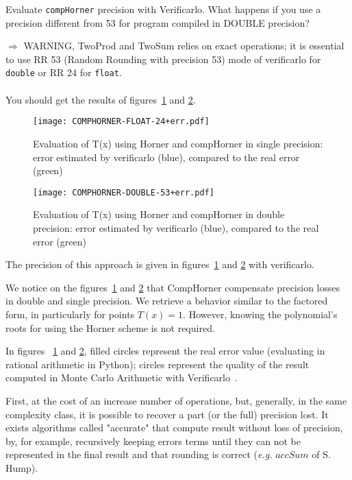 \begin{question}
  Evaluate {\tt compHorner} precision with Verificarlo. What happens if you use a precision different from 53 for program compiled in DOUBLE precision?

  $\Rightarrow$ WARNING, {\sc TwoProd} and {\sc TwoSum} relies on exact operations; it is essential to use RR 53 (Random Rounding with precision 53) mode of verificarlo for  \texttt{double} or RR 24 for \texttt{float}.
  \\~\\
  You should get the results of figures~\ref{fig:comphornerVerificarlo24} and \ref{fig:comphornerVerificarlo53}.
\end{question}

\begin{figure}[h!]
\center \texttt{[image: COMPHORNER-FLOAT-24+err.pdf]}
  \caption{Evaluation of T(x) using Horner and compHorner in single precision: error estimated by verificarlo (blue), compared to the real error (green) }
  \label{fig:comphornerVerificarlo24}
\end{figure}

\begin{figure}[h!]
\center \texttt{[image: COMPHORNER-DOUBLE-53+err.pdf]}
  \caption{Evaluation of T(x) using Horner and compHorner in double precision: error estimated by verificarlo (blue), compared to the real error (green)}
  \label{fig:comphornerVerificarlo53}
\end{figure}

The precision of this approach is given in figures~\ref{fig:comphornerVerificarlo24} and \ref{fig:comphornerVerificarlo53} with verificarlo.

We notice on the figures~\ref{fig:comphornerVerificarlo24} and \ref{fig:comphornerVerificarlo53} that CompHorner compensate precision losses in double and single precision. We retrieve a behavior similar to the factored form, in particularly for points $T(x)=1$. However, knowing the polynomial's roots for using the Horner scheme is not required.

In figures ~\ref{fig:comphornerVerificarlo24} and \ref{fig:comphornerVerificarlo53}, filled circles represent the real error value (evaluating in rational arithmetic in Python); circles represent the quality of the result computed in Monte Carlo Arithmetic with Verificarlo~\cite{verrou}.

First, at the cost of an increase number of operations, but, generally, in the same complexity class, it is possible to recover a part (or the full) precision lost. It exists algorithms called "accurate" that compute result without loss of precision, by, for example, recursively keeping errors terms until they can not be represented in the final result and that rounding is correct ({\it e.g.} $accSum$ of S. Hump).

